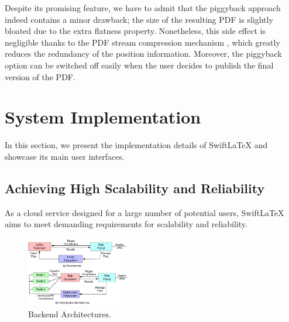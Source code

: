 \documentclass[sigconf]{acmart}
\newcommand{\todo}[1]{\textbf{\{TODO: #1\}}}
\begin{document}
Despite its promising feature, we have to admit that the piggyback approach indeed contains a minor drawback; the size of the resulting PDF is slightly bloated due to the extra flatness property. 
Nonetheless, this side effect is negligible thanks to the PDF stream compression mechanism \cite{libpdf2008}, which greatly reduces the redundancy of the position information. 
Moreover, the piggyback option can be  switched off easily when the user decides to publish the final version of the PDF.















\section{System Implementation}\label{sect:imp}
In this section, we present the implementation details of SwiftLaTeX and showcase its main user interfaces.

\subsection{Achieving High Scalability and Reliability}
As a cloud service designed for a large number of potential users, SwiftLaTeX aims to meet demanding requirements for scalability and reliability.

\begin{figure}[t]
\begin{center}
\includegraphics[width=0.40\textwidth]{figure/cloudarchitecture}
\caption{Backend Architectures.}
\label{fig:cloudarch}
\end{center}

\end{figure}
\end{document}
